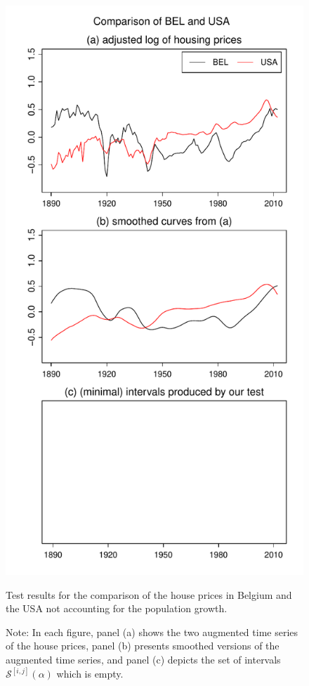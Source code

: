 \documentclass[a4paper,12pt]{article}
\begin{document}
\begin{enumerate}[label=\arabic*.,leftmargin=0.6cm]
\begin{figure}[p!]
\hspace{0.1cm}
\begin{minipage}[t]{0.48\textwidth}
\includegraphics[width=\textwidth]{output/BEL_vs_USA}
\caption{Test results for the comparison of the house prices in Belgium and the USA not accounting for the population growth.}\label{fig:hp:Belgium:USA}
\end{minipage}
\caption*{Note: In each figure, panel (a) shows the two augmented time series of the house prices, panel (b) presents smoothed versions of the augmented time series, and panel (c) depicts the set of intervals $\mathcal{S}^{[i, j]}(\alpha)$ which is empty.}
\end{figure}


\end{enumerate}
\end{document}

